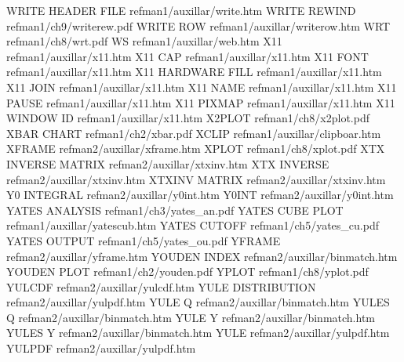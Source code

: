 WRITE HEADER FILE                       refman1/auxillar/write.htm
WRITE REWIND                            refman1/ch9/writerew.pdf
WRITE ROW                               refman1/auxillar/writerow.htm
WRT                                     refman1/ch8/wrt.pdf
WS                                      refman1/auxillar/web.htm
X11                                     refman1/auxillar/x11.htm
X11 CAP                                 refman1/auxillar/x11.htm
X11 FONT                                refman1/auxillar/x11.htm
X11 HARDWARE FILL                       refman1/auxillar/x11.htm
X11 JOIN                                refman1/auxillar/x11.htm
X11 NAME                                refman1/auxillar/x11.htm
X11 PAUSE                               refman1/auxillar/x11.htm
X11 PIXMAP                              refman1/auxillar/x11.htm
X11 WINDOW ID                           refman1/auxillar/x11.htm
X2PLOT                                  refman1/ch8/x2plot.pdf
XBAR CHART                              refman1/ch2/xbar.pdf
XCLIP                                   refman1/auxillar/clipboar.htm
XFRAME                                  refman2/auxillar/xframe.htm
XPLOT                                   refman1/ch8/xplot.pdf
XTX INVERSE MATRIX                      refman2/auxillar/xtxinv.htm
XTX INVERSE                             refman2/auxillar/xtxinv.htm
XTXINV MATRIX                           refman2/auxillar/xtxinv.htm
Y0 INTEGRAL                             refman2/auxillar/y0int.htm
Y0INT                                   refman2/auxillar/y0int.htm
YATES ANALYSIS                          refman1/ch3/yates_an.pdf
YATES CUBE PLOT                         refman1/auxillar/yatescub.htm
YATES CUTOFF                            refman1/ch5/yates_cu.pdf
YATES OUTPUT                            refman1/ch5/yates_ou.pdf
YFRAME                                  refman2/auxillar/yframe.htm
YOUDEN INDEX                            refman2/auxillar/binmatch.htm
YOUDEN PLOT                             refman1/ch2/youden.pdf
YPLOT                                   refman1/ch8/yplot.pdf
YULCDF                                  refman2/auxillar/yulcdf.htm
YULE DISTRIBUTION                       refman2/auxillar/yulpdf.htm
YULE Q                                  refman2/auxillar/binmatch.htm
YULES Q                                 refman2/auxillar/binmatch.htm
YULE Y                                  refman2/auxillar/binmatch.htm
YULES Y                                 refman2/auxillar/binmatch.htm
YULE                                    refman2/auxillar/yulpdf.htm
YULPDF                                  refman2/auxillar/yulpdf.htm
